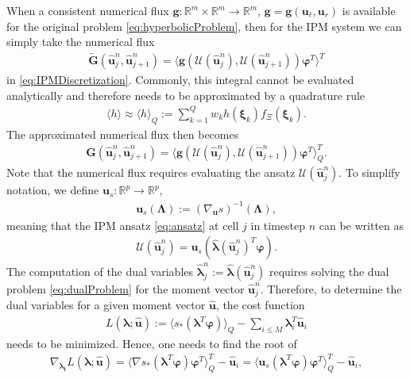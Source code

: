 When a consistent numerical flux $\bm g:\mathbb{R}^m\times\mathbb{R}^m\to\mathbb{R}^m$, $\bm g = \bm g(\bm u_\ell, \bm u_r)$ is available for the original problem \eqref{eq:hyperbolicProblem}, then for the IPM system we can simply take the numerical flux
\begin{align*}
 \bm{\tilde G}(\bm{\hat u}_{j}^n,\bm{\hat u}_{j+1}^{n}) = \langle \bm g(\mathcal{U}(\bm{\hat u}_j^n),\mathcal{U}(\bm{\hat u}_{j+1}^n))\bm{\varphi}^T\rangle^T
\end{align*}
in \eqref{eq:IPMDiscretization}. Commonly, this integral cannot be evaluated analytically and therefore needs to be approximated by a quadrature rule
\begin{align*}
\langle h \rangle \approx \langle h \rangle_{Q} := \sum_{k=1}^Q w_k h(\bm{\xi}_k)f_{\Xi}(\bm{\xi}_k).
\end{align*}
The approximated numerical flux then becomes
\begin{align}\label{eq:numericalFluxIPM}
 \bm{G}(\bm{\hat u}_{j}^n,\bm{\hat u}_{j+1}^{n}) = \langle \bm g(\mathcal{U}(\bm{\hat u}_j^n),\mathcal{U}(\bm{\hat u}_{j+1}^n))\bm{\varphi}^T\rangle^T_Q.
\end{align}
Note that the numerical flux requires evaluating the ansatz $\mathcal{U}(\bm{\hat u}_j^n)$. To simplify notation, we define $\bm{u}_{s}:\mathbb{R}^p \to \mathbb{R}^p$,
\begin{align*}
\bm{u}_{s}(\bm\Lambda):=\left( \nabla_{\bm{u}} s \right)^{-1}(\bm\Lambda),
\end{align*}
meaning that the IPM ansatz \eqref{eq:ansatz} at cell $j$ in timestep $n$ can be written as
\begin{align*}
\mathcal{U}(\bm{\hat u}_j^n) = \bm{u}_{s}(\bm{\hat{\lambda}}(\bm{\hat u}_j^n)^T \bm{\varphi}).
\end{align*}
The computation of the dual variables $\bm{\hat\lambda}_j^n:=\bm{\hat\lambda}(\bm{\hat u}_j^n)$ requires solving the dual problem \eqref{eq:dualProblem} for the moment vector $\bm{\hat u}_{j}^{n}$. Therefore, to determine the dual variables for a given moment vector $\bm{\hat{u}}$, the cost function
\begin{align}\label{eq:L}
L(\bm{\lambda};\bm{\hat{u}}) := \langle s_*(\bm{\lambda}^T \bm\varphi)\rangle_Q - \sum_{i\leq M}\bm{\lambda}_i^T \bm{\hat u}_i
\end{align}
needs to be minimized. Hence, one needs to find the root of
\begin{align*}
\nabla_{\bm{\lambda_i}}L(\bm{\lambda};\bm{\hat{u}}) = \langle \nabla s_*(\bm{\lambda}^T \bm\varphi)\bm\varphi^T\rangle_Q^T - \bm{\hat u}_i = \langle \bm u_s(\bm{\lambda}^T \bm\varphi)\bm\varphi^T\rangle_Q^T - \bm{\hat u}_i,
\end{align*}
